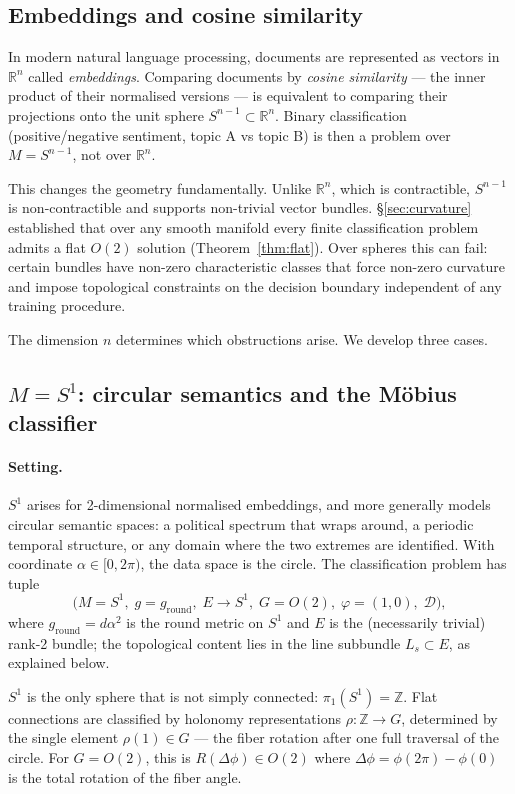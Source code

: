 \documentclass[11pt, a4paper]{article}
\theoremstyle{plain}
\theoremstyle{definition}
\newcommand{\R}{\mathbb{R}}
\begin{document}
\subsection{Embeddings and cosine similarity}

In modern natural language processing, documents are represented as vectors in
$\R^n$ called \emph{embeddings}. Comparing documents by \emph{cosine similarity}
--- the inner product of their normalised versions --- is equivalent to comparing
their projections onto the unit sphere $S^{n-1} \subset \R^n$. Binary
classification (positive/negative sentiment, topic A vs topic B) is then a
problem over $M = S^{n-1}$, not over $\R^n$.

This changes the geometry fundamentally. Unlike $\R^n$, which is contractible,
$S^{n-1}$ is non-contractible and supports non-trivial vector bundles.
\S\ref{sec:curvature} established that over any smooth manifold every finite
classification problem admits a flat $O(2)$ solution (Theorem~\ref{thm:flat}).
Over spheres this can fail: certain bundles have non-zero characteristic classes
that force non-zero curvature and impose topological constraints on the decision
boundary independent of any training procedure.

The dimension $n$ determines which obstructions arise. We develop three cases.

\subsection{$M = S^1$: circular semantics and the Möbius classifier}

\paragraph{Setting.}
$S^1$ arises for 2-dimensional normalised embeddings, and more generally models
circular semantic spaces: a political spectrum that wraps around, a periodic
temporal structure, or any domain where the two extremes are identified. With
coordinate $\alpha \in [0, 2\pi)$, the data space is the circle. The
classification problem has tuple
\[
  \bigl(M = S^1,\; g = g_{\mathrm{round}},\; E \to S^1,\;
        G = O(2),\; \varphi = (1,0),\; \mathcal{D}\bigr),
\]
where $g_{\mathrm{round}} = d\alpha^2$ is the round metric on $S^1$ and $E$ is
the (necessarily trivial) rank-2 bundle; the topological content lies in the
line subbundle $L_s \subset E$, as explained below.

$S^1$ is the only sphere that is not simply connected: $\pi_1(S^1) = \mathbb{Z}$.
Flat connections are classified by holonomy representations $\rho: \mathbb{Z} \to G$,
determined by the single element $\rho(1) \in G$ --- the fiber rotation after one
full traversal of the circle. For $G = O(2)$, this is $R(\Delta\phi) \in O(2)$
where $\Delta\phi = \phi(2\pi) - \phi(0)$ is the total rotation of the fiber angle.
\end{document}
